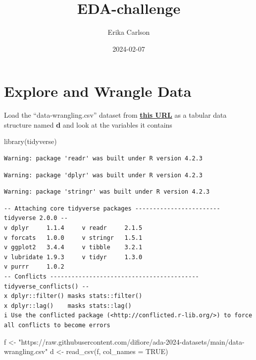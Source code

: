 \documentclass[
  letterpaper,
  DIV=11,
  numbers=noendperiod]{scrartcl}
\title{EDA-challenge}
\author{Erika Carlson}
\date{2024-02-07}
\newenvironment{Shaded}{\begin{snugshade}}{\end{snugshade}}
\newcommand{\AttributeTok}[1]{\textcolor[rgb]{0.40,0.45,0.13}{#1}}
\newcommand{\ConstantTok}[1]{\textcolor[rgb]{0.56,0.35,0.01}{#1}}
\newcommand{\FunctionTok}[1]{\textcolor[rgb]{0.28,0.35,0.67}{#1}}
\newcommand{\NormalTok}[1]{\textcolor[rgb]{0.00,0.23,0.31}{#1}}
\newcommand{\OtherTok}[1]{\textcolor[rgb]{0.00,0.23,0.31}{#1}}
\newcommand{\StringTok}[1]{\textcolor[rgb]{0.13,0.47,0.30}{#1}}
\renewcommand*\contentsname{Table of contents}
\newcommand\contentsname{Table of contents}
\begin{document}
\maketitle

\renewcommand*\contentsname{Table of contents}
{
\hypersetup{linkcolor=}
\setcounter{tocdepth}{3}
\tableofcontents
}
\section{Explore and Wrangle Data}\label{explore-and-wrangle-data}

Load the ``data-wrangling.csv'' dataset from
\href{https://raw.githubusercontent.com/difiore/ada-2024-datasets/main/data-wrangling.csv}{\textbf{this
URL}} as a tabular data structure named \textbf{d} and look at the
variables it contains

\begin{Shaded}
\begin{Highlighting}[]
\FunctionTok{library}\NormalTok{(tidyverse)}
\end{Highlighting}
\end{Shaded}

\begin{verbatim}
Warning: package 'readr' was built under R version 4.2.3
\end{verbatim}

\begin{verbatim}
Warning: package 'dplyr' was built under R version 4.2.3
\end{verbatim}

\begin{verbatim}
Warning: package 'stringr' was built under R version 4.2.3
\end{verbatim}

\begin{verbatim}
-- Attaching core tidyverse packages ------------------------ tidyverse 2.0.0 --
v dplyr     1.1.4     v readr     2.1.5
v forcats   1.0.0     v stringr   1.5.1
v ggplot2   3.4.4     v tibble    3.2.1
v lubridate 1.9.3     v tidyr     1.3.0
v purrr     1.0.2     
-- Conflicts ------------------------------------------ tidyverse_conflicts() --
x dplyr::filter() masks stats::filter()
x dplyr::lag()    masks stats::lag()
i Use the conflicted package (<http://conflicted.r-lib.org/>) to force all conflicts to become errors
\end{verbatim}

\begin{Shaded}
\begin{Highlighting}[]
\NormalTok{f }\OtherTok{\textless{}{-}} \StringTok{"https://raw.githubusercontent.com/difiore/ada{-}2024{-}datasets/main/data{-}wrangling.csv"}
\NormalTok{d }\OtherTok{\textless{}{-}} \FunctionTok{read\_csv}\NormalTok{(f, }\AttributeTok{col\_names =} \ConstantTok{TRUE}\NormalTok{)}
\end{Highlighting}
\end{Shaded}
\end{document}
